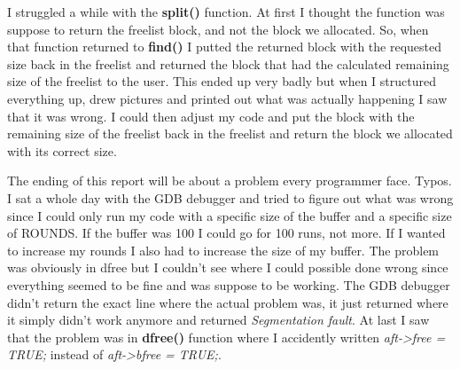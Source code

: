 \documentclass[12pt, letterpaper]{article}
\begin{document}
I struggled a while with the \textbf{split()} function. At first I thought the function was suppose to return the freelist block, and not the block we allocated. 
So, when that function returned to \textbf{find()} I putted the returned block with the requested size back in the freelist and returned the block that had the calculated 
remaining size of the freelist to the user. This ended up very badly but when I structured everything up, drew pictures and printed out what was actually happening I saw that 
it was wrong. I could then adjust my code and put the block with the remaining size of the freelist back in the freelist and return the block we allocated with its correct size.

The ending of this report will be about a problem every programmer face. Typos. I sat a whole day with the GDB debugger and tried to figure out what was wrong since
I could only run my code with a specific size of the buffer and a specific size of ROUNDS. If the buffer was 100 I could go for 100 runs, not more. If I wanted to increase 
my rounds I also had to increase the size of my buffer. The problem was obviously in dfree but I couldn't see where I could possible done wrong since everything seemed to be 
fine and was suppose to be working. The GDB debugger didn't return the exact line where the actual problem was, it just returned where it simply didn't work anymore and returned 
\emph{Segmentation fault}. At last I saw that the problem was in \textbf{dfree()} function where I accidently written \emph{aft->free = TRUE;} instead of \emph{aft->bfree = TRUE;}.
\end{document}
